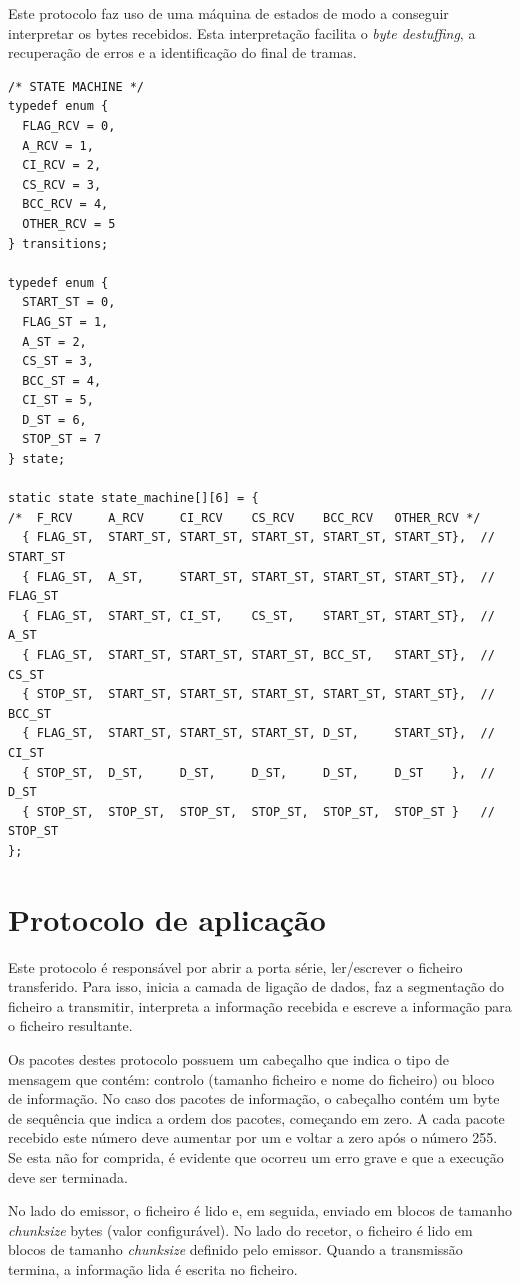 \documentclass[11pt]{report}
\begin{document}
Este protocolo faz uso de uma máquina de estados de modo a conseguir interpretar
os bytes recebidos. Esta interpretação facilita o \textit{byte destuffing}, a
recuperação de erros e a identificação do final de tramas.
\begin{lstlisting}
/* STATE MACHINE */
typedef enum {
  FLAG_RCV = 0,
  A_RCV = 1,
  CI_RCV = 2,
  CS_RCV = 3,
  BCC_RCV = 4,
  OTHER_RCV = 5
} transitions;

typedef enum {
  START_ST = 0,
  FLAG_ST = 1,
  A_ST = 2,
  CS_ST = 3,
  BCC_ST = 4,
  CI_ST = 5,
  D_ST = 6,
  STOP_ST = 7
} state;

static state state_machine[][6] = {
/*  F_RCV     A_RCV     CI_RCV    CS_RCV    BCC_RCV   OTHER_RCV */
  { FLAG_ST,  START_ST, START_ST, START_ST, START_ST, START_ST},  // START_ST
  { FLAG_ST,  A_ST,     START_ST, START_ST, START_ST, START_ST},  // FLAG_ST
  { FLAG_ST,  START_ST, CI_ST,    CS_ST,    START_ST, START_ST},  // A_ST
  { FLAG_ST,  START_ST, START_ST, START_ST, BCC_ST,   START_ST},  // CS_ST
  { STOP_ST,  START_ST, START_ST, START_ST, START_ST, START_ST},  // BCC_ST
  { FLAG_ST,  START_ST, START_ST, START_ST, D_ST,     START_ST},  // CI_ST
  { STOP_ST,  D_ST,     D_ST,     D_ST,     D_ST,     D_ST    },  // D_ST
  { STOP_ST,  STOP_ST,  STOP_ST,  STOP_ST,  STOP_ST,  STOP_ST }   // STOP_ST
};
\end{lstlisting}

\section{Protocolo de aplicação}

Este protocolo é responsável por abrir a porta série, ler/escrever o ficheiro
transferido. Para isso, inicia a camada de ligação de dados, faz a segmentação
do ficheiro a transmitir, interpreta a informação recebida e escreve a
informação para o ficheiro resultante.

Os pacotes destes protocolo possuem um cabeçalho que indica o tipo de mensagem
que contém: controlo (tamanho ficheiro e nome do ficheiro) ou bloco de
informação. No caso dos pacotes de informação, o cabeçalho contém um byte
de sequência que indica a ordem dos pacotes, começando em zero. A cada pacote
recebido este número deve aumentar por um e voltar a zero após o número 255.
Se esta não for comprida, é evidente que ocorreu um erro grave e que a execução
deve ser terminada.

No lado do emissor, o ficheiro é lido e, em seguida, enviado em blocos de
tamanho \textit{chunksize} bytes (valor configurável). No lado do recetor, o
ficheiro é lido em blocos de tamanho \textit{chunksize} definido pelo emissor.
Quando a transmissão termina, a informação lida é escrita no ficheiro.
\end{document}

